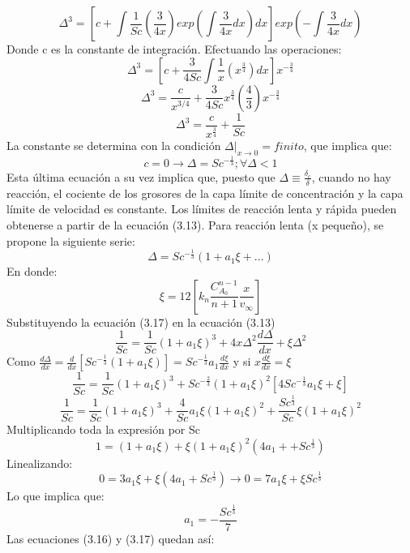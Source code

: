 \begin{equation*}
    \Delta^3=[c+\int \frac{1}{Sc}(\frac{3}{4x})exp(\int\frac{3}{4x}dx)dx]exp(-\int \frac{3}{4x}dx)
\end{equation*}
Donde c es la constante de integración. Efectuando las operaciones:
\begin{equation*}
    \Delta^3=[c+\frac{3}{4 Sc}\int \frac{1}{x}(x^{\frac{3}{4}})dx]x^{-\frac{3}{4}}
\end{equation*}
\begin{equation*}
    \Delta^3=\frac{c}{x^{3/4}}+\frac{3}{4Sc}x^{\frac{3}{4}}(\frac{4}{3})x^{-\frac{3}{4}}
\end{equation*}
\begin{equation}
    \Delta^3=\frac{c}{x^{\frac{3}{4}}}+\frac{1}{Sc}
\end{equation}
La constante se determina con la condición $\Delta|_{x\rightarrow 0}=finito$, que implica que:
\begin{equation}
    c=0\rightarrow\Delta= Sc^{-\frac{1}{3}}; \forall\Delta<1
\end{equation}
Esta última ecuación a su vez implica que, puesto que $\Delta\equiv\frac{\delta_c}{\delta}$, cuando no hay reacción, el cociente de los grosores de la capa límite de concentración y la capa límite de velocidad es constante. Los límites de reacción lenta y rápida pueden obtenerse a partir de la ecuación (3.13). Para reacción lenta (x pequeño), se propone la siguiente serie:
\begin{equation}
    \Delta= Sc^{-\frac{1}{3}}(1+a_1\xi+...)
\end{equation}
En donde:
\begin{equation}
    \xi=12[k_n\frac{C_{A_0}^{n-1}}{n+1}\frac{x}{v_\infty}]
\end{equation}
Substituyendo la ecuación (3.17) en la ecuación (3.13)
\begin{equation*}
    \frac{1}{Sc}=\frac{1}{Sc}(1+a_1\xi)^3+4x\Delta^2\frac{d\Delta}{dx}+\xi\Delta^2
\end{equation*}
Como $\frac{d\Delta}{dx}=\frac{d}{dx}[Sc^{-\frac{1}{3}}(1+a_1\xi)]=Sc^{-\frac{1}{3}}a_1\frac{d\xi}{dx}$ y si $x\frac{d\xi}{dx}=\xi$
\begin{equation*}
    \frac{1}{Sc}=\frac{1}{Sc}(1+a_1\xi)^3+Sc^{-\frac{2}{3}}(1+a_1\xi)^2[4Sc^{-\frac{1}{3}}a_1\xi+\xi]
\end{equation*}
\begin{equation*}
    \frac{1}{Sc}=\frac{1}{Sc}(1+a_1\xi)^3+\frac{4}{Sc}a_1\xi (1+a_1\xi)^2+\frac{Sc^{\frac{1}{3}}}{Sc}\xi(1+a_1\xi)^2
\end{equation*}
Multiplicando toda la expresión por Sc
\begin{equation*}
    1=(1+a_1\xi)+\xi(1+a_1\xi)^2(4a_1++Sc^{\frac{1}{3}})
\end{equation*}
Linealizando:
\begin{equation*}
    0=3a_1\xi+\xi(4a_1+Sc^{\frac{1}{3}})\rightarrow0=7a_1\xi+\xi Sc^{\frac{1}{3}}
\end{equation*}
Lo que implica que:
\begin{equation}
    a_1=-\frac{Sc^{\frac{1}{3}}}{7}
\end{equation}
Las ecuaciones (3.16) y (3.17) quedan así: 

